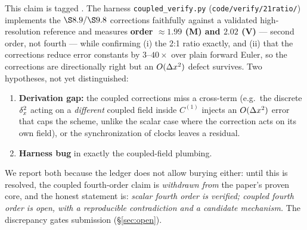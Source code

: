 This claim is tagged \tagC. The harness \texttt{coupled\_verify.py}
(\texttt{code/verify/21ratio/}) implements the $\S8.9/\S9.8$ corrections
faithfully against a validated high-resolution reference and measures
\textbf{order $\approx 1.99$ (M) and $2.02$ (V)} --- second order, not fourth ---
while confirming (i) the 2:1 ratio exactly, and (ii) that the corrections
reduce error constants by $3$--$40\times$ over plain forward Euler, so the
corrections are directionally right but an $O(\Delta x^2)$ defect survives. Two
hypotheses, not yet distinguished:
\begin{enumerate}
\item[(A)] \textbf{Derivation gap:} the coupled corrections miss a cross-term
(e.g.\ the discrete $\delta_x^2$ acting on a \emph{different} coupled field inside
$C^{(1)}$ injects an $O(\Delta x^2)$ error that caps the scheme, unlike the scalar
case where the correction acts on its own field), or the synchronization of
clocks leaves a residual.
\item[(B)] \textbf{Harness bug} in exactly the coupled-field plumbing.
\end{enumerate}
We report both because the ledger does not allow burying either: until this is
resolved, the coupled fourth-order claim is \emph{withdrawn from} the paper's
proven core, and the honest statement is: \emph{scalar fourth order is verified;
coupled fourth order is open, with a reproducible contradiction and a
candidate mechanism.} The discrepancy gates submission (\S\ref{sec:open}).
